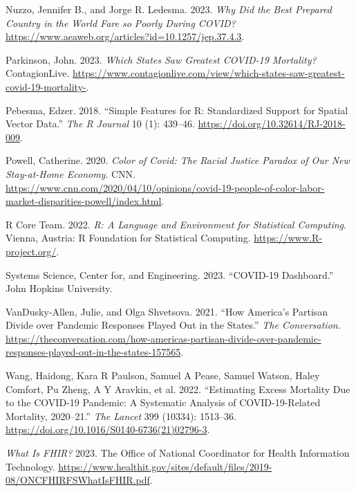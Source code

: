 \documentclass[
  letterpaper,
  DIV=11,
  numbers=noendperiod]{scrartcl}
\newlength{\cslhangindent}
\newlength{\cslentryspacingunit} %
\newenvironment{CSLReferences}[2] %
 {%
  \setlength{\parindent}{0pt}
  \ifodd #1
  \let\oldpar\par
  \def\par{\hangindent=\cslhangindent\oldpar}
  \fi
  \setlength{\parskip}{#2\cslentryspacingunit}
 }%
 {}
\begin{document}
\begin{CSLReferences}{1}{0}
\leavevmode{}%
Nuzzo, Jennifer B., and Jorge R. Ledesma. 2023. \emph{Why Did the Best
Prepared Country in the World Fare so Poorly During COVID?}
\url{https://www.aeaweb.org/articles?id=10.1257/jep.37.4.3}.

\leavevmode{}%
Parkinson, John. 2023. \emph{Which States Saw Greatest COVID-19
Mortality?} ContagionLive.
\url{https://www.contagionlive.com/view/which-states-saw-greatest-covid-19-mortality-}.

\leavevmode{}%
Pebesma, Edzer. 2018. {``{Simple Features for R: Standardized Support
for Spatial Vector Data}.''} \emph{{The R Journal}} 10 (1): 439--46.
\url{https://doi.org/10.32614/RJ-2018-009}.

\leavevmode{}%
Powell, Catherine. 2020. \emph{Color of Covid: The Racial Justice
Paradox of Our New Stay-at-Home Economy}. CNN.
\url{https://www.cnn.com/2020/04/10/opinions/covid-19-people-of-color-labor-market-disparities-powell/index.html}.

\leavevmode{}%
R Core Team. 2022. \emph{R: A Language and Environment for Statistical
Computing}. Vienna, Austria: R Foundation for Statistical Computing.
\url{https://www.R-project.org/}.

\leavevmode{}%
Systems Science, Center for, and Engineering. 2023. {``COVID-19
Dashboard.''} John Hopkins University.

\leavevmode{}%
VanDusky-Allen, Julie, and Olga Shvetsova. 2021. {``How America's
Partisan Divide over Pandemic Responses Played Out in the States.''}
\emph{The Conversation}.
\url{https://theconversation.com/how-americas-partisan-divide-over-pandemic-responses-played-out-in-the-states-157565}.

\leavevmode{}%
Wang, Haidong, Kara R Paulson, Samuel A Pease, Samuel Watson, Haley
Comfort, Pu Zheng, A Y Aravkin, et al. 2022. {``Estimating Excess
Mortality Due to the COVID-19 Pandemic: A Systematic Analysis of
COVID-19-Related Mortality, 2020--21.''} \emph{The Lancet} 399 (10334):
1513--36. \url{https://doi.org/10.1016/S0140-6736(21)02796-3}.

\leavevmode{}%
\emph{What Is FHIR?} 2023. The Office of National Coordinator for Health
Information Technology.
\url{https://www.healthit.gov/sites/default/files/2019-08/ONCFHIRFSWhatIsFHIR.pdf}.


\end{CSLReferences}
\end{document}
